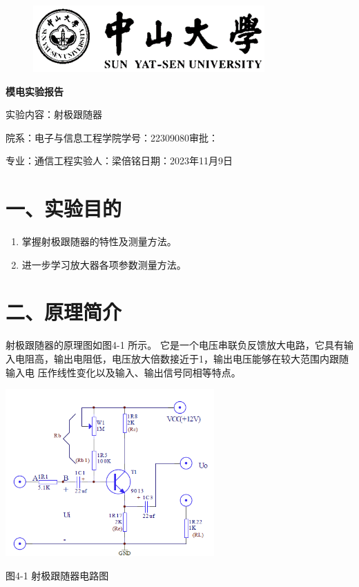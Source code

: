 \documentclass[a4paper,10pt,notitlepage]{article}
\begin{document}
	\large
	\onehalfspacing
	\begin{figure}[h]
		\raggedright
		\includegraphics{1.png}
	\end{figure}
	\centering
	{\Huge\textbf{模电实验报告}\par}
	\vspace{0.2cm}
	{\huge{实验内容：射极跟随器}\par}
	\raggedright
	\vspace{0.3cm}
	\begin{centering}
		{\large 院系：电子与信息工程学院\hfill 学号：22309080\hfill 审批：\hspace{2cm} \par
			专业：通信工程\hfill 实验人：梁倍铭\hfill 日期：2023年11月9日 \par}
	\end{centering}
	\vspace{0.3cm}
	\section*{一、实验目的}
	\begin{enumerate}
		\item 掌握射极跟随器的特性及测量方法。
		\item 进一步学习放大器各项参数测量方法。
	\end{enumerate}
	\section*{二、原理简介}
	射极跟随器的原理图如图4-1 所示。 它是一个电压串联负反馈放大电路，它具有输
	入电阻高，输出电阻低，电压放大倍数接近于1，输出电压能够在较大范围内跟随输入电
	压作线性变化以及输入、输出信号同相等特点。
	\begin{table}[h]
		\centering
		\includegraphics[width=0.6\textwidth]{2.png}
		\caption*{图4-1 射极跟随器电路图}
	\end{table}
\end{document}
